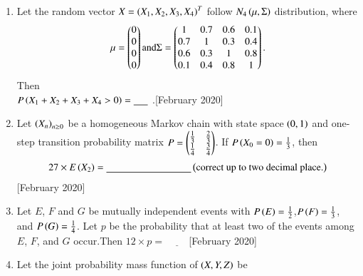 \documentclass[journal]{IEEEtran}
\begin{document}
\begin{enumerate}
    \begin{align}
    \varphi_X(t) = \begin{cases} 
      \frac{\sin {t} \cos {t}}{t}, & \text{for } t \neq 0 \\ 
      1, & \text{for } t = 0 
    \end{cases}
    \end{align}
    Then $P\brak{|X| \leq \frac{3}{4} } = \underline{\hspace{1cm}}$ .\hfill[February 2020]
    \item Let the random vector $X = \left(X_1, X_2, X_3, X_4\right)^T$ follow $N_4\left(\mu, \Sigma\right)$ distribution, where
    \begin{align}
    \mu = \begin{pmatrix}0 \\ 0 \\ 0 \\ 0\end{pmatrix} \text{and} \Sigma = \begin{pmatrix}1 & 0.7 & 0.6 & 0.1 \\ 0.7 & 1 & 0.3 & 0.4 \\ 0.6 & 0.3 & 1 & 0.8 \\ 0.1 & 0.4 & 0.8 & 1\end{pmatrix}.
    \end{align}
    Then
    \\$P\left(X_1 + X_2 + X_3 + X_4 > 0\right) = \underline{\hspace{0.5cm}}$ .\hfill[February 2020]
    \item Let $\left(X_n\right)_{n \geq 0}$ be a homogeneous Markov chain with state space $\left(0,1\right)$ and one-step transition probability matrix $P = \begin{pmatrix}\frac{1}{3} & \frac{2}{3} \\ \frac{1}{4} & \frac{3}{4}\end{pmatrix}$. If $P\left(X_0 = 0\right) = \frac{1}{3}$, then
    \begin{align}
    27 \times E\brak{X_2} = \underline{\hspace{3cm}} \brak{\text{correct up to two decimal place.}}
    \end{align}\hfill[February 2020]
     \item Let $E$, $F$ and $G$ be mutually independent events with $P\left(E\right)=\frac{1}{2}$,$P\left(F\right) = \frac{1}{3}$, and $P\left(G\right)=\frac{1}{4}$. Let $p$ be the probability that at least two of the events among $E$, $F$, and $G$ occur.Then $12 \times p = \underline{\hspace{1cm}}$\hfill[February 2020]
     \item Let the joint probability mass function of $\left(X, Y, Z\right)$ be
    \begin{align}

\end{align}
\end{enumerate}
\end{document}
